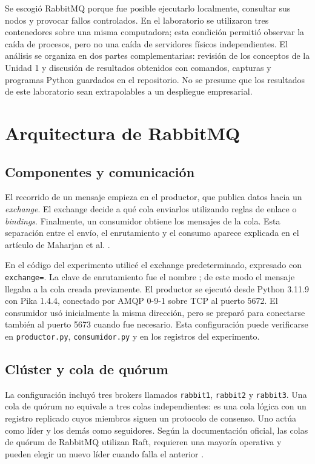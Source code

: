 \documentclass[12pt,a4paper]{article}
\begin{document}
Se escogió RabbitMQ porque fue posible ejecutarlo localmente, consultar sus nodos y provocar fallos controlados. En el laboratorio se utilizaron tres contenedores sobre una misma computadora; esta condición permitió observar la caída de procesos, pero no una caída de servidores físicos independientes. El análisis se organiza en dos partes complementarias: revisión de los conceptos de la Unidad 1 y discusión de resultados obtenidos con comandos, capturas y programas Python guardados en el repositorio. No se presume que los resultados de este laboratorio sean extrapolables a un despliegue empresarial.

\section{Arquitectura de RabbitMQ}
\subsection{Componentes y comunicación}
El recorrido de un mensaje empieza en el productor, que publica datos hacia un \emph{exchange}. El exchange decide a qué cola enviarlos utilizando reglas de enlace o \emph{bindings}. Finalmente, un consumidor obtiene los mensajes de la cola. Esta separación entre el envío, el enrutamiento y el consumo aparece explicada en el artículo de Maharjan et al. \cite{Maharjan2023}.

En el código del experimento utilicé el exchange predeterminado, expresado con \texttt{exchange=}. La clave de enrutamiento fue el nombre ; de este modo el mensaje llegaba a la cola creada previamente. El productor se ejecutó desde Python 3.11.9 con Pika 1.4.4, conectado por AMQP 0-9-1 sobre TCP al puerto 5672. El consumidor usó inicialmente la misma dirección, pero se preparó para conectarse también al puerto 5673 cuando fue necesario. Esta configuración puede verificarse en \texttt{productor.py}, \texttt{consumidor.py} y en los registros del experimento.

\subsection{Clúster y cola de quórum}
La configuración incluyó tres brokers llamados \texttt{rabbit1}, \texttt{rabbit2} y \texttt{rabbit3}. Una cola de quórum no equivale a tres colas independientes: es una cola lógica con un registro replicado cuyos miembros siguen un protocolo de consenso. Uno actúa como líder y los demás como seguidores. Según la documentación oficial, las colas de quórum de RabbitMQ utilizan Raft, requieren una mayoría operativa y pueden elegir un nuevo líder cuando falla el anterior \cite{RabbitMQQuorum2026}.
\end{document}
